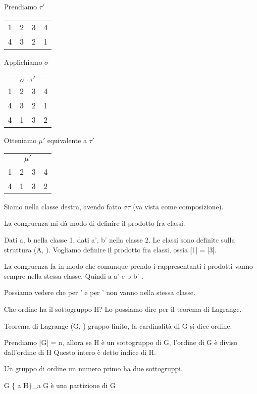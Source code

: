 Prendiamo $\tau'$

\begin{tabular}{cccc}
1 & 2 & 3 & 4 \\
4 & 3 & 2 & 1
\end{tabular}

Applichiamo $\sigma$

\begin{tabular}{cccc}
\multicolumn{4}{c}{$\sigma \cdot \tau'$} \\
1 & 2 & 3 & 4 \\
4 & 3 & 2 & 1 \\
4 & 1 & 3 & 2
\end{tabular}

Otteniamo $\mu'$ equivalente a $\tau'$

\begin{tabular}{cccc}
\multicolumn{4}{c}{$\mu'$} \\
1 & 2 & 3 & 4 \\
4 & 1 & 3 & 2
\end{tabular}


Siamo nella classe destra, avendo fatto $\sigma \tau$ (va vista come composizione).


La congruenza mi d\`a modo di definire il prodotto fra classi. 

Dati a, b nella classe 1, dati a', b' nella classe 2. Le classi sono definite sulla struttura (A, \cdot). Vogliamo definire il prodotto fra classi, ossia [1] \cdot [2] = [3]. 

La congruenza fa in modo che comunque prendo i rappresentanti i prodotti vanno sempre nella stessa classe. Quindi a \cdot a' e b \cdot b' \in [3].

Possiamo vedere che \tau per \tau' e \mu per \mu' non vanno nella stessa classe.

Che ordine ha il sottogruppo H? Lo possiamo dire per il teorema di Lagrange.

Teorema di Lagrange
(G, \cdot) gruppo finito, la cardinalit\`a di G si dice ordine.

Prendiamo |G| = n, allora se H \`e un sottogruppo di G, l'ordine di G \`e diviso dall'ordine di H
Questo intero \`e detto indice di H.

Un gruppo di ordine un numero primo ha due sottogruppi.

G \to \{ a H\}_{a \in G}
\`e una partizione di G

